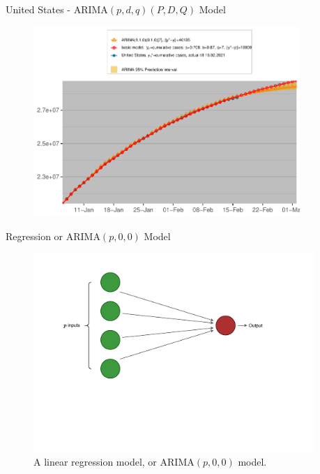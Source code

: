 \documentclass{beamer}
\begin{document}
\begin{frame}{United States - ARIMA$(p,d,q)(P,D,Q)$ Model}
\begin{figure}
\includegraphics[width=0.9\textwidth]{Plots/United States-arimay.pdf}
\end{figure}
\end{frame}

\begin{frame}{Regression or ARIMA$(p,0,0)$ Model}
\begin{figure}
\includegraphics[trim={1cm 6cm 4cm 1cm},clip, width=0.95\textwidth]{Plots/NeuralNetNoHidden.pdf}
\caption{A linear regression model, or ARIMA$(p,0,0)$ model.}
\end{figure}
\end{frame}
\end{document}
